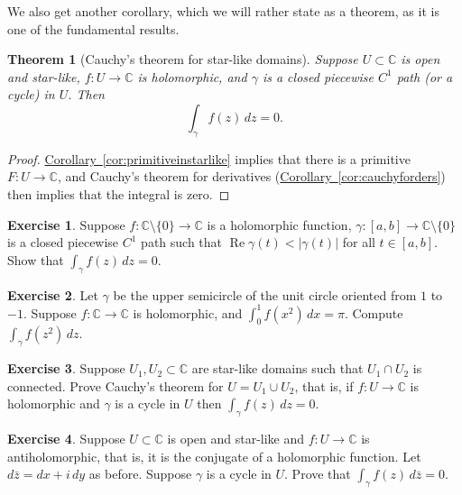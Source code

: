 \documentclass[12pt,openany]{book}
\renewcommand{\Re}{\operatorname{Re}}
\newcommand{\sabs}[1]{\lvert {#1} \rvert}
\newcommand{\C}{{\mathbb{C}}}
\theoremstyle{plain}
\newtheorem{thm}{Theorem}[section]
\theoremstyle{remark}
\theoremstyle{definition}
\newenvironment{exbox}{%
    \def\FrameCommand{\vrule width 1pt \relax\hspace{10pt}}%
    \MakeFramed{\advance\hsize-\width\FrameRestore}%
}{%
    \endMakeFramed
}
\theoremstyle{exercise}
\newtheorem{exercise}{Exercise}[section]
\theoremstyle{example}
\newcommand{\corref}[1]{\hyperref[#1]{Corollary~\ref*{#1}}}
\begin{document}
We also get another corollary, which we will rather state
as a theorem, as it is one of the fundamental results.

\begin{thm}[Cauchy's theorem for star-like domains]
%
Suppose $U \subset \C$ is open and star-like, $f \colon U \to \C$ is holomorphic,
and $\gamma$ is a closed piecewise $C^1$ path (or a cycle) in $U$.  Then
\begin{equation*}
\int_{\gamma} f(z) \, dz = 0 .
\end{equation*}
\end{thm}

\begin{proof}
\corref{cor:primitiveinstarlike} implies that there is
a primitive $F \colon U \to \C$, and
Cauchy's theorem for derivatives (\corref{cor:cauchyforders}) then implies that the integral is zero.
\end{proof}

\begin{exbox}
\begin{exercise}
Suppose $f \colon \C \setminus \{ 0 \} \to \C$ is a holomorphic function,
$\gamma \colon [a,b] \to \C \setminus \{ 0 \}$ is a closed piecewise $C^1$ path
such that $\Re \gamma(t) < \sabs{\gamma(t)}$ for all $t \in [a,b]$.
Show that $\int_\gamma f(z) \, dz = 0$.
\end{exercise}

\begin{exercise}
Let $\gamma$ be the upper semicircle of the unit circle oriented from $1$ to
$-1$.   Suppose $f \colon \C \to \C$ is holomorphic, and $\int_0^1 f(x^2) \,
dx = \pi$.  Compute $\int_\gamma f(z^2) \, dz$.
\end{exercise}

\begin{exercise}
Suppose $U_1, U_2 \subset \C$ are star-like domains such that $U_1 \cap U_2$
is connected.  Prove Cauchy's theorem for $U = U_1 \cup U_2$, that is,
if $f \colon U \to \C$ is holomorphic and $\gamma$ is a cycle in $U$
then $\int_\gamma f(z) \, dz = 0$.
\end{exercise}

\begin{exercise}
Suppose $U \subset \C$ is open and star-like and
$f \colon U \to \C$ is antiholomorphic, that is, it is the conjugate of a
holomorphic function.  Let $d\bar{z} = dx + i \, dy$ as before.  Suppose
$\gamma$ is a cycle in $U$.  Prove that
$\int_\gamma f(z) \, d\bar{z} = 0$.
\end{exercise}
\end{exbox}
\end{document}
